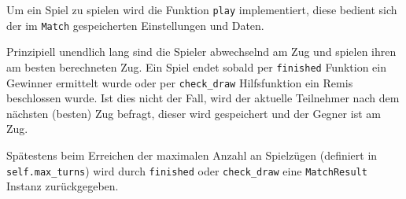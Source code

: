 \documentclass[11pt]{article}
\begin{document}
    Um ein Spiel zu spielen wird die Funktion \texttt{play} implementiert,
diese bedient sich der im \texttt{Match} gespeicherten Einstellungen und
Daten.

Prinzipiell unendlich lang sind die Spieler abwechselnd am Zug und
spielen ihren am besten berechneten Zug. Ein Spiel endet sobald per
\texttt{finished} Funktion ein Gewinner ermittelt wurde oder per
\texttt{check\_draw} Hilfsfunktion ein Remis beschlossen wurde. Ist dies
nicht der Fall, wird der aktuelle Teilnehmer nach dem nächsten (besten)
Zug befragt, dieser wird gespeichert und der Gegner ist am Zug.

Spätestens beim Erreichen der maximalen Anzahl an Spielzügen (definiert
in \texttt{self.max\_turns}) wird durch \texttt{finished} oder
\texttt{check\_draw} eine \texttt{MatchResult} Instanz zurückgegeben.
\end{document}
